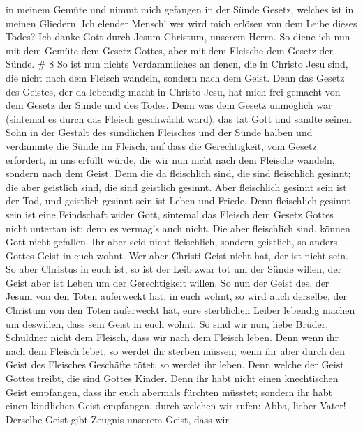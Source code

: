 in meinem Gemüte und nimmt mich gefangen in der Sünde Gesetz, welches
ist in meinen Gliedern.  Ich elender Mensch! wer wird mich
erlösen von dem Leibe dieses Todes?  Ich danke Gott durch
Jesum Christum, unserem Herrn. So diene ich nun mit dem Gemüte dem
Gesetz Gottes, aber mit dem Fleische dem Gesetz der Sünde. \# 8
 So ist nun nichts Verdammliches an denen, die in Christo
Jesu sind, die nicht nach dem Fleisch wandeln, sondern nach dem Geist.
 Denn das Gesetz des Geistes, der da lebendig macht in
Christo Jesu, hat mich frei gemacht von dem Gesetz der Sünde und des
Todes.  Denn was dem Gesetz unmöglich war (sintemal es durch
das Fleisch geschwächt ward), das tat Gott und sandte seinen Sohn in der
Gestalt des sündlichen Fleisches und der Sünde halben und verdammte die
Sünde im Fleisch,  auf dass die Gerechtigkeit, vom Gesetz
erfordert, in uns erfüllt würde, die wir nun nicht nach dem Fleische
wandeln, sondern nach dem Geist.  Denn die da fleischlich
sind, die sind fleischlich gesinnt; die aber geistlich sind, die sind
geistlich gesinnt.  Aber fleischlich gesinnt sein ist der
Tod, und geistlich gesinnt sein ist Leben und Friede.  Denn
fleischlich gesinnt sein ist eine Feindschaft wider Gott, sintemal das
Fleisch dem Gesetz Gottes nicht untertan ist; denn es vermag's auch
nicht.  Die aber fleischlich sind, können Gott nicht
gefallen.  Ihr aber seid nicht fleischlich, sondern
geistlich, so anders Gottes Geist in euch wohnt. Wer aber Christi Geist
nicht hat, der ist nicht sein.  So aber Christus in euch
ist, so ist der Leib zwar tot um der Sünde willen, der Geist aber ist
Leben um der Gerechtigkeit willen.  So nun der Geist des,
der Jesum von den Toten auferweckt hat, in euch wohnt, so wird auch
derselbe, der Christum von den Toten auferweckt hat, eure sterblichen
Leiber lebendig machen um deswillen, dass sein Geist in euch wohnt.
 So sind wir nun, liebe Brüder, Schuldner nicht dem
Fleisch, dass wir nach dem Fleisch leben.  Denn wenn ihr
nach dem Fleisch lebet, so werdet ihr sterben müssen; wenn ihr aber
durch den Geist des Fleisches Geschäfte tötet, so werdet ihr leben.
 Denn welche der Geist Gottes treibt, die sind Gottes
Kinder.  Denn ihr habt nicht einen knechtischen Geist
empfangen, dass ihr euch abermals fürchten müsstet; sondern ihr habt
einen kindlichen Geist empfangen, durch welchen wir rufen: Abba, lieber
Vater!  Derselbe Geist gibt Zeugnis unserem Geist, dass wir
